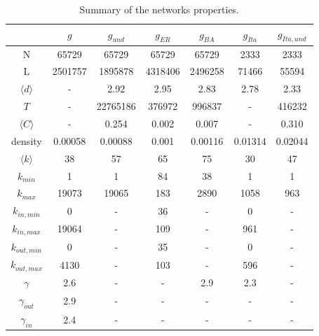 \documentclass[11pt, twoside]{report}
\begin{document}
\begin{table}[htbp]
  \centering
\begin{tabular}{ccccccc}
\toprule
{} &        $g$ &     $g_{und}$ &        $g_{ER}$ &        $g_{BA}$ &    $g_{Ita}$ & $g_{Ita,und}$ \\
\midrule
N         &    65729 &     65729 &       65729 &       65729 &     2333 &      2333 \\
L         &  2501757 &   1895878 &     4318406 &     2496258 &    71466 &     55594 \\
  $\langle d \rangle$     &     - &   2.92 &     2.95 &     2.83 &  2.78 &   2.33 \\
  $T$         &     - &  22765186 &      376972 &      996837 &     - &    416232 \\
$\langle C \rangle$   &     - &  0.254 &  0.002 &  0.007 &     - &  0.310 \\
density   &  0.00058 &   0.00088 &       0.001 &     0.00116 &  0.01314 &   0.02044 \\
  \midrule
  $\langle k \rangle$     &       38 &        57 &          65 &          75 &       30 &        47 \\
$k_{min}$     &        1 &         1 &          84 &          38 &        1 &         1 \\
$k_{max}$     &    19073 &     19065 &         183 &        2890 &     1058 &       963 \\

$k_{in,min}$  &        0 &      - &          36 &        - &        0 &      - \\
$k_{in,max}$  &    19064 &      - &         109 &        - &      961 &      - \\

$k_{out,min}$ &        0 &      - &          35 &        - &        0 &      - \\
$k_{out,max}$ &     4130 &      - &         103 &        - &      596 &      - \\

\midrule
$\gamma$     &      2.6 &      - &        - &         2.9 &      2.3 &      - \\
  $\gamma_{out}$ &      2.9 &      - &        - &        - &     - &      - \\
$\gamma_{in}$  &      2.4 &      - &        - &        - &     - &      - \\
\bottomrule
\end{tabular}
\caption{Summary of the networks properties.}
  \label{tab:summary}
\end{table}
\end{document}
